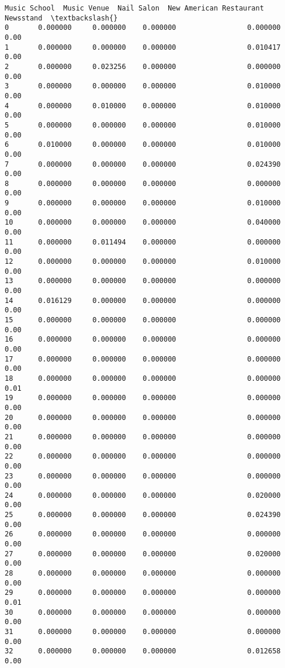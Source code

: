 \documentclass[11pt]{article}
\begin{document}
\begin{tcolorbox}[breakable, size=fbox, boxrule=.5pt, pad at break*=1mm, opacityfill=0]
\begin{Verbatim}[commandchars=\\\{\}]
    Music School  Music Venue  Nail Salon  New American Restaurant  Newsstand  \textbackslash{}
0       0.000000     0.000000    0.000000                 0.000000       0.00
1       0.000000     0.000000    0.000000                 0.010417       0.00
2       0.000000     0.023256    0.000000                 0.000000       0.00
3       0.000000     0.000000    0.000000                 0.010000       0.00
4       0.000000     0.010000    0.000000                 0.010000       0.00
5       0.000000     0.000000    0.000000                 0.010000       0.00
6       0.010000     0.000000    0.000000                 0.010000       0.00
7       0.000000     0.000000    0.000000                 0.024390       0.00
8       0.000000     0.000000    0.000000                 0.000000       0.00
9       0.000000     0.000000    0.000000                 0.010000       0.00
10      0.000000     0.000000    0.000000                 0.040000       0.00
11      0.000000     0.011494    0.000000                 0.000000       0.00
12      0.000000     0.000000    0.000000                 0.010000       0.00
13      0.000000     0.000000    0.000000                 0.000000       0.00
14      0.016129     0.000000    0.000000                 0.000000       0.00
15      0.000000     0.000000    0.000000                 0.000000       0.00
16      0.000000     0.000000    0.000000                 0.000000       0.00
17      0.000000     0.000000    0.000000                 0.000000       0.00
18      0.000000     0.000000    0.000000                 0.000000       0.01
19      0.000000     0.000000    0.000000                 0.000000       0.00
20      0.000000     0.000000    0.000000                 0.000000       0.00
21      0.000000     0.000000    0.000000                 0.000000       0.00
22      0.000000     0.000000    0.000000                 0.000000       0.00
23      0.000000     0.000000    0.000000                 0.000000       0.00
24      0.000000     0.000000    0.000000                 0.020000       0.00
25      0.000000     0.000000    0.000000                 0.024390       0.00
26      0.000000     0.000000    0.000000                 0.000000       0.00
27      0.000000     0.000000    0.000000                 0.020000       0.00
28      0.000000     0.000000    0.000000                 0.000000       0.00
29      0.000000     0.000000    0.000000                 0.000000       0.01
30      0.000000     0.000000    0.000000                 0.000000       0.00
31      0.000000     0.000000    0.000000                 0.000000       0.00
32      0.000000     0.000000    0.000000                 0.012658       0.00

\end{Verbatim}
\end{tcolorbox}
\end{document}
